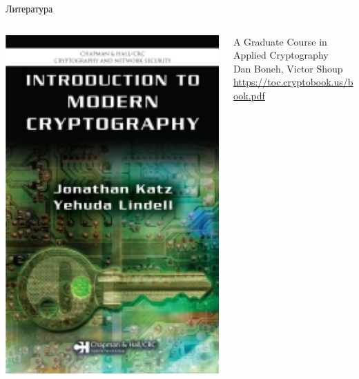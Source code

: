 \documentclass[usenames,dvipsnames,8pt,aspectratio=169]{beamer}
\begin{document}
\begin{frame}{Литература}
\Large
\begin{columns}[T]
	\begin{column}{0.5\textwidth}
		\includegraphics[scale=0.25]{katz_lindel_book}
	\end{column}
	\begin{column}{0.55\textwidth}
	\vspace{40pt}
	A Graduate Course in Applied Cryptography \\[5pt]
	Dan Boneh, Victor Shoup \\[5pt]
	\url{https://toc.cryptobook.us/book.pdf}
	\end{column}
\end{columns}

\end{frame}
\end{document}
